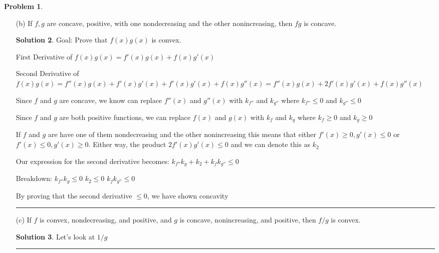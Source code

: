 \documentclass{article}
\theoremstyle{definition}
\newtheorem{problem}{Problem}
\def\fline{\rule{0.75\linewidth}{0.5pt}}
\newcommand{\finishline}{\begin{center}\fline\end{center}}
\newtheorem*{solution*}{Solution}
\newenvironment{solution}{\begin{solution*}}{{\finishline} \end{solution*}}
\begin{document}
\begin{problem}
\begin{itemize}
\begin{solution}
            By proving that the second derivative $\geq 0$, we have shown convexity

        \end{solution}
        \item[(b)] If $f, g$ are concave, positive, with one nondecreasing and the other nonincreasing, then $fg$ is concave.

        \begin{solution}
            Goal: Prove that $f(x) g(x)$ is convex. \newline 

            First Derivative of $f(x) g(x) = f'(x) g(x) + f(x) g'(x)$ \newline 

            Second Derivative of $f(x) g(x) = f''(x) g(x) + f'(x) g'(x) + f'(x) g'(x) + f(x) g''(x) = f''(x) g(x) + 2f'(x)g'(x) + f(x) g''(x)$

            Since $f$ and $g$ are concave, we know can replace $f''(x)$ and $g''(x)$ with $k_{f''}$ and $k_{g''}$ where $k_{f''} \leq 0$ and $k_{g''} \leq 0$

            Since $f$ and $g$ are both positive functions, we can replace $f(x)$ and $g(x)$ with $k_{f}$ and $k_{g}$ where $k_{f} \geq 0$ and $k_{g} \geq 0$

            If $f$ and $g$ are have one of them nondecreasing and the other nonincreasing this means that either $f'(x) \geq 0, g'(x) \leq 0$ or $f'(x) \leq 0, g'(x) \geq 0$. Either way, the product $2f'(x)g'(x) \leq 0$ and we can denote this as $k_2$

            Our expression for the second derivative becomes: \newline 
            $k_{f''} k_{g} + k_2 + k_{f} k_{g''} \leq 0$ \newline

            Breakdown: \newline 
            $k_{f''} k_{g} \leq 0$ \newline 
            $k_2 \leq 0$ \newline 
            $k_{f} k_{g''} \leq 0$ \newline 

            By proving that the second derivative $\leq 0$, we have shown concavity
            

        \end{solution}
        \item[(c)] If $f$ is convex, nondecreasing, and positive, and $g$ is concave, nonincreasing, and positive, then $f /g$ is convex.
        \begin{solution}
            Let's look at $1/g$ \newline 


\end{solution}
\end{itemize}
\end{problem}
\end{document}
